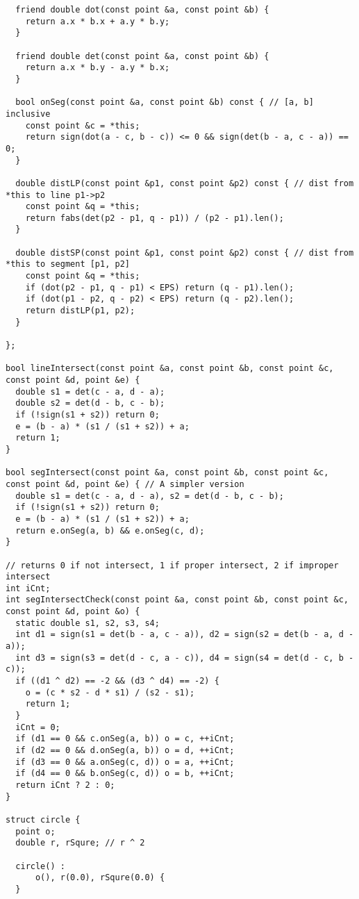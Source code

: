 \begin{lstlisting}
  friend double dot(const point &a, const point &b) {
    return a.x * b.x + a.y * b.y;
  }

  friend double det(const point &a, const point &b) {
    return a.x * b.y - a.y * b.x;
  }

  bool onSeg(const point &a, const point &b) const { // [a, b] inclusive
    const point &c = *this;
    return sign(dot(a - c, b - c)) <= 0 && sign(det(b - a, c - a)) == 0;
  }

  double distLP(const point &p1, const point &p2) const { // dist from *this to line p1->p2
    const point &q = *this;
    return fabs(det(p2 - p1, q - p1)) / (p2 - p1).len();
  }

  double distSP(const point &p1, const point &p2) const { // dist from *this to segment [p1, p2]
    const point &q = *this;
    if (dot(p2 - p1, q - p1) < EPS) return (q - p1).len();
    if (dot(p1 - p2, q - p2) < EPS) return (q - p2).len();
    return distLP(p1, p2);
  }

};

bool lineIntersect(const point &a, const point &b, const point &c, const point &d, point &e) {
  double s1 = det(c - a, d - a);
  double s2 = det(d - b, c - b);
  if (!sign(s1 + s2)) return 0;
  e = (b - a) * (s1 / (s1 + s2)) + a;
  return 1;
}

bool segIntersect(const point &a, const point &b, const point &c, const point &d, point &e) { // A simpler version
  double s1 = det(c - a, d - a), s2 = det(d - b, c - b);
  if (!sign(s1 + s2)) return 0;
  e = (b - a) * (s1 / (s1 + s2)) + a;
  return e.onSeg(a, b) && e.onSeg(c, d);
}

// returns 0 if not intersect, 1 if proper intersect, 2 if improper intersect
int iCnt;
int segIntersectCheck(const point &a, const point &b, const point &c, const point &d, point &o) {
  static double s1, s2, s3, s4;
  int d1 = sign(s1 = det(b - a, c - a)), d2 = sign(s2 = det(b - a, d - a));
  int d3 = sign(s3 = det(d - c, a - c)), d4 = sign(s4 = det(d - c, b - c));
  if ((d1 ^ d2) == -2 && (d3 ^ d4) == -2) {
    o = (c * s2 - d * s1) / (s2 - s1);
    return 1;
  }
  iCnt = 0;
  if (d1 == 0 && c.onSeg(a, b)) o = c, ++iCnt;
  if (d2 == 0 && d.onSeg(a, b)) o = d, ++iCnt;
  if (d3 == 0 && a.onSeg(c, d)) o = a, ++iCnt;
  if (d4 == 0 && b.onSeg(c, d)) o = b, ++iCnt;
  return iCnt ? 2 : 0;
}

struct circle {
  point o;
  double r, rSqure; // r ^ 2

  circle() :
      o(), r(0.0), rSqure(0.0) {
  }


\end{lstlisting}
